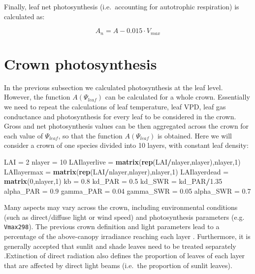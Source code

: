 \documentclass[]{book}
\newenvironment{Shaded}{\begin{snugshade}}{\end{snugshade}}
\newcommand{\KeywordTok}[1]{\textcolor[rgb]{0.13,0.29,0.53}{\textbf{#1}}}
\newcommand{\DecValTok}[1]{\textcolor[rgb]{0.00,0.00,0.81}{#1}}
\newcommand{\FloatTok}[1]{\textcolor[rgb]{0.00,0.00,0.81}{#1}}
\newcommand{\StringTok}[1]{\textcolor[rgb]{0.31,0.60,0.02}{#1}}
\newcommand{\OperatorTok}[1]{\textcolor[rgb]{0.81,0.36,0.00}{\textbf{#1}}}
\newcommand{\NormalTok}[1]{#1}
\begin{document}
Finally, leaf net photosynthesis (i.e.~accounting for autotrophic
respiration) is calculated as:

\begin{equation}
A_n = A - 0.015 \cdot V_{max}
\end{equation}

\section{Crown photosynthesis}\label{crown-photosynthesis}

In the previous subsection we calculated photosynthesis at the leaf
level. However, the function \(A(\Psi_{leaf})\) can be calculated for a
whole crown. Essentially we need to repeat the calculations of leaf
temperature, leaf VPD, leaf gas conductance and photosynthesis for every
leaf to be considered in the crown. Gross and net photosynthesis values
can be then aggregated across the crown for each value of
\(\Psi_{leaf}\), so that the function \(A(\Psi_{leaf})\) is obtained.
Here we will consider a crown of one species divided into 10 layers,
with constant leaf density:

\begin{Shaded}
\begin{Highlighting}[]
\NormalTok{LAI =}\StringTok{ }\DecValTok{2}
\NormalTok{nlayer =}\StringTok{ }\DecValTok{10}
\NormalTok{LAIlayerlive =}\StringTok{ }\KeywordTok{matrix}\NormalTok{(}\KeywordTok{rep}\NormalTok{(LAI}\OperatorTok{/}\NormalTok{nlayer,nlayer),nlayer,}\DecValTok{1}\NormalTok{)}
\NormalTok{LAIlayermax =}\StringTok{ }\KeywordTok{matrix}\NormalTok{(}\KeywordTok{rep}\NormalTok{(LAI}\OperatorTok{/}\NormalTok{nlayer,nlayer),nlayer,}\DecValTok{1}\NormalTok{)}
\NormalTok{LAIlayerdead =}\StringTok{ }\KeywordTok{matrix}\NormalTok{(}\DecValTok{0}\NormalTok{,nlayer,}\DecValTok{1}\NormalTok{)}
\NormalTok{kb =}\StringTok{ }\FloatTok{0.8}
\NormalTok{kd_PAR =}\StringTok{ }\FloatTok{0.5}
\NormalTok{kd_SWR =}\StringTok{ }\NormalTok{kd_PAR}\OperatorTok{/}\FloatTok{1.35}
\NormalTok{alpha_PAR =}\StringTok{ }\FloatTok{0.9}
\NormalTok{gamma_PAR =}\StringTok{ }\FloatTok{0.04}
\NormalTok{gamma_SWR =}\StringTok{ }\FloatTok{0.05}
\NormalTok{alpha_SWR =}\StringTok{ }\FloatTok{0.7}
\end{Highlighting}
\end{Shaded}

Many aspects may vary across the crown, including environmental
conditions (such as direct/diffuse light or wind speed) and
photosynthesis parameters (e.g. \texttt{Vmax298}). The previous crown
definition and light parameters lead to a percentage of the above-canopy
irradiance reaching each layer \citep{Anten2016}. Furthermore, it is
generally accepted that sunlit and shade leaves need to be treated
separately \citep{DePury1997}.Extinction of direct radiation also
defines the proportion of leaves of each layer that are affected by
direct light beams (i.e.~the proportion of sunlit leaves).
\end{document}
